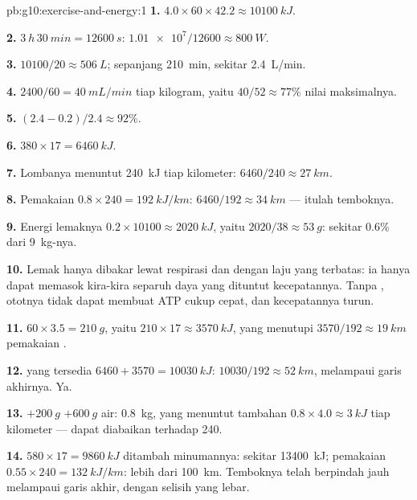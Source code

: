 \begin{solution}{pb:g10:exercise-and-energy:1}
\textbf{1.} $4.0 \times 60 \times 42.2 \approx \qty{10100}{kJ}$.

\textbf{2.} $\qty{3}{h}\,\qty{30}{min} = \qty{12600}{s}$:
$\num{1.01e7}/12600 \approx \qty{800}{W}$.

\textbf{3.} $10100/20 \approx \qty{506}{L}$; sepanjang \qty{210}{min},
sekitar \qty{2.4}{L/min}.

\textbf{4.} $2400/60 = \qty{40}{mL/min}$ tiap kilogram, yaitu $40/52
\approx 77\%$ nilai maksimalnya.

\textbf{5.} $(2.4 - 0.2)/2.4 \approx 92\%$.

\textbf{6.} $380 \times 17 = \qty{6460}{kJ}$.

\textbf{7.} Lombanya menuntut \qty{240}{kJ} tiap kilometer: $6460/240
\approx \qty{27}{km}$.

\textbf{8.} Pemakaian  $0.8 \times 240 = \qty{192}{kJ/km}$:
$6460/192 \approx \qty{34}{km}$ --- itulah temboknya.

\textbf{9.} Energi lemaknya $0.2 \times 10100 \approx \qty{2020}{kJ}$,
yaitu $2020/38 \approx \qty{53}{g}$: sekitar 0.6\% dari \qty{9}{kg}-nya.

\textbf{10.} Lemak hanya dibakar lewat respirasi dan dengan laju yang
terbatas: ia hanya dapat memasok kira-kira separuh daya yang dituntut
kecepatannya. Tanpa , ototnya tidak dapat membuat ATP cukup
cepat, dan kecepatannya turun.

\textbf{11.} $60 \times 3.5 = \qty{210}{g}$, yaitu $210 \times 17 \approx
\qty{3570}{kJ}$, yang menutupi $3570/192 \approx \qty{19}{km}$
pemakaian .

\textbf{12.}  yang tersedia $6460 + 3570 = \qty{10030}{kJ}$:
$10030/192 \approx \qty{52}{km}$, melampaui garis akhirnya. Ya.

\textbf{13.} $+\qty{200}{g}$  $+ \qty{600}{g}$ air:
\qty{0.8}{kg}, yang menuntut tambahan $0.8 \times 4.0 \approx \qty{3}{kJ}$
tiap kilometer --- dapat diabaikan terhadap 240.

\textbf{14.}  $580 \times 17 = \qty{9860}{kJ}$ ditambah
minumannya: sekitar \qty{13400}{kJ}; pemakaian  $0.55 \times 240 =
\qty{132}{kJ/km}$: lebih dari \qty{100}{km}. Temboknya
telah berpindah jauh melampaui garis akhir, dengan selisih yang lebar.


\end{solution}
